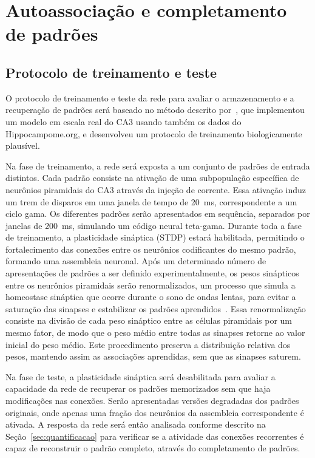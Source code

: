 \section{Autoassociação e completamento de padrões}

\subsection{Protocolo de treinamento e teste}\label{sec:protocolo_treinamento_teste}

O protocolo de treinamento e teste da rede para avaliar o armazenamento e a recuperação de padrões será baseado no método descrito
por~, que implementou um modelo em escala real do CA3 usando também os dados do Hippocampome.org,
e desenvolveu um protocolo de treinamento biologicamente plausível.

Na fase de treinamento, a rede será exposta a um conjunto de padrões de entrada distintos. Cada padrão consiste na ativação de uma
subpopulação específica de neurônios piramidais do CA3 através da injeção de corrente. Essa ativação induz um trem de disparos em
uma janela de tempo de \SI{20}{\milli\second}, correspondente a um ciclo gama. Os diferentes padrões serão apresentados em
sequência, separados por janelas de \SI{200}{\milli\second}, simulando um código neural teta-gama. Durante toda a fase de
treinamento, a plasticidade sináptica (STDP) estará habilitada, permitindo o fortalecimento das conexões entre os neurônios
codificantes do mesmo padrão, formando uma assembleia neuronal. Após um determinado número de apresentações de padrões a ser
definido experimentalmente, os pesos sinápticos entre os neurônios piramidais serão renormalizados, um processo que simula a
homeostase sináptica que ocorre durante o sono de ondas lentas, para evitar a saturação das sinapses e estabilizar os padrões
aprendidos~\cite{gonzalez-ruedaActivityDependent2018, kopsickFormation2024}. Essa renormalização consiste na divisão de cada peso
sináptico entre as células piramidais por um mesmo fator, de modo que o peso médio entre todas as sinapses retorne ao valor
inicial do peso médio. Este procedimento preserva a distribuição relativa dos pesos, mantendo assim as associações aprendidas, sem
que as sinapses saturem.

Na fase de teste, a plasticidade sináptica será desabilitada para avaliar a capacidade da rede de recuperar os padrões memorizados
sem que haja modificações nas conexões. Serão apresentadas versões degradadas dos padrões originais, onde apenas uma fração dos
neurônios da assembleia correspondente é ativada. A resposta da rede será então analisada conforme descrito na
Seção~\ref{sec:quantificacao} para verificar se a atividade das conexões recorrentes é capaz de reconstruir o padrão completo,
através do completamento de padrões.


